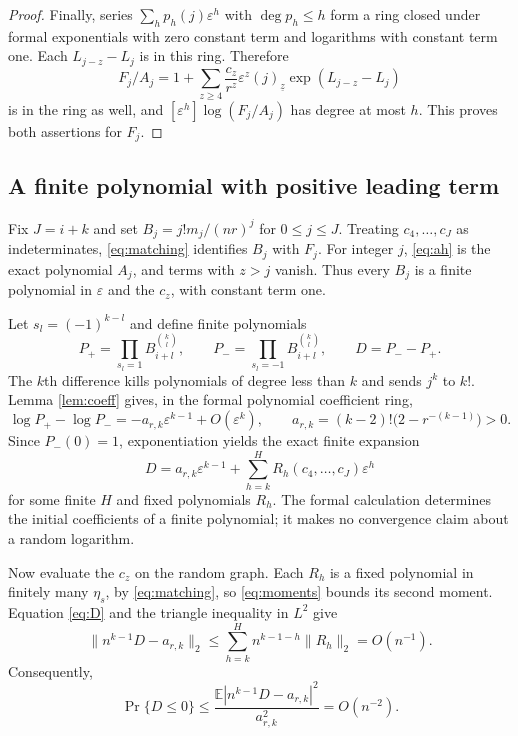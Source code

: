 \documentclass[11pt]{article}
\newcommand{\eps}{\varepsilon}
\newcommand{\fall}[2]{(#1)_{\underline{#2}}}
\begin{document}
\begin{proof}
Finally, series $\sum_h p_h(j)\eps^h$ with $\deg p_h\le h$
form a ring closed under formal exponentials with zero constant
term and logarithms with constant term one. Each $L_{j-z}-L_j$
is in this ring. Therefore
\[
 F_j/A_j=1+\sum_{z\ge4}\frac{c_z}{r^z}
      \eps^z\fall{j}{z}\exp(L_{j-z}-L_j)
\]
is in the ring as well, and $[\eps^h]\log(F_j/A_j)$ has degree
at most $h$. This proves both assertions for $F_j$.
\end{proof}

\subsection*{A finite polynomial with positive leading term}
Fix $J=i+k$ and set $B_j=j!m_j/(nr)^j$ for $0\le j\le J$.
Treating $c_4,\ldots,c_J$ as indeterminates, \eqref{eq:matching}
identifies $B_j$ with $F_j$. For integer $j$, \eqref{eq:ah} is
the exact polynomial $A_j$, and terms with $z>j$ vanish. Thus every
$B_j$ is a finite polynomial in $\eps$ and the $c_z$, with
constant term one.

Let $s_l=(-1)^{k-l}$ and define finite polynomials
\[
 P_+=\prod_{s_l=1}B_{i+l}^{\binom kl},\qquad
 P_-=\prod_{s_l=-1}B_{i+l}^{\binom kl},\qquad D=P_--P_+.
\]
The $k$th difference kills polynomials of degree less than $k$ and
sends $j^k$ to $k!$. Lemma \ref{lem:coeff} gives, in the formal
polynomial coefficient ring,
\begin{equation}\label{eq:logdifference}
 \log P_+-\log P_-=
 -a_{r,k}\eps^{k-1}+O(\eps^k),\qquad
 a_{r,k}=(k-2)!\bigl(2-r^{-(k-1)}\bigr)>0.
\end{equation}
Since $P_-(0)=1$, exponentiation yields the exact finite expansion
\begin{equation}\label{eq:D}
 D=a_{r,k}\eps^{k-1}+\sum_{h=k}^{H}R_h(c_4,\ldots,c_J)\eps^h
\end{equation}
for some finite $H$ and fixed polynomials $R_h$. The formal
calculation determines the initial coefficients of a finite
polynomial; it makes no convergence claim about a random logarithm.

Now evaluate the $c_z$ on the random graph. Each $R_h$ is a fixed
polynomial in finitely many $\eta_s$, by \eqref{eq:matching}, so
\eqref{eq:moments} bounds its second moment. Equation \eqref{eq:D}
and the triangle inequality in $L^2$ give
\[
 \bigl\|n^{k-1}D-a_{r,k}\bigr\|_2
 \le\sum_{h=k}^H n^{k-1-h}\|R_h\|_2=O(n^{-1}).
\]
Consequently,
\begin{equation}\label{eq:prob}
 \Pr\{D\le0\}\le
 \frac{\mathbb E|n^{k-1}D-a_{r,k}|^2}{a_{r,k}^2}=O(n^{-2}).
\end{equation}
\end{document}
